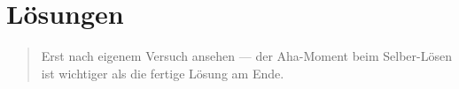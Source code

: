 %
%

\chapter{Lösungen}

\begin{quote}
Erst nach eigenem Versuch ansehen — der Aha-Moment beim Selber-Lösen
ist wichtiger als die fertige Lösung am Ende.
\end{quote}









